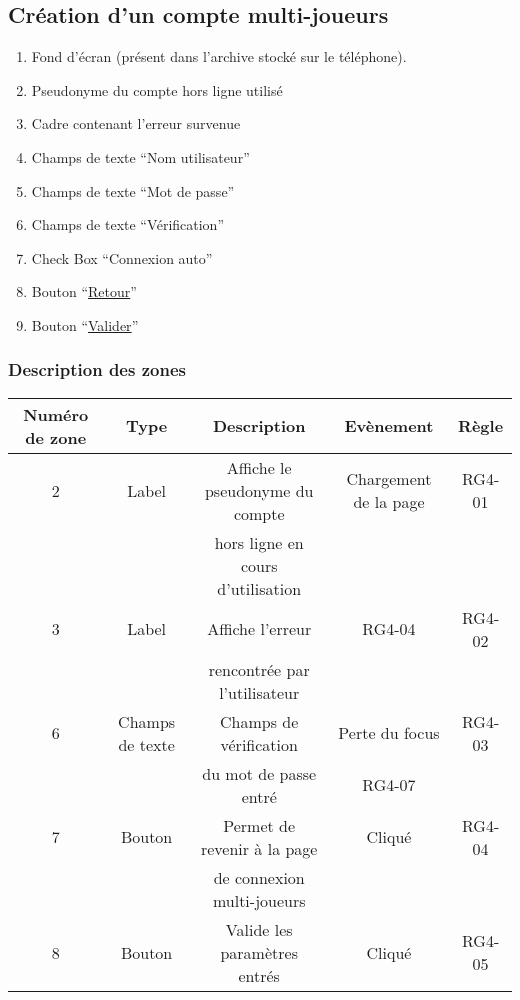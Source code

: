 \documentclass{report}
\begin{document}
\newpage

	\subsection{Création d'un compte multi-joueurs}
	
		\hypertarget{Creation compte multi-joueurs}{}
		\label{Creation compte multi-joueurs}
	
		\begin{center}
			
		\end{center}
		
		\begin{enumerate}
		  \item Fond d'écran (présent dans l'archive stocké sur le téléphone).
		  \item Pseudonyme du compte hors ligne utilisé
		  \item Cadre contenant l'erreur survenue
		  \item Champs de texte ``Nom utilisateur''
		  \item Champs de texte ``Mot de passe''
		  \item Champs de texte ``Vérification''
		  \item Check Box ``Connexion auto''
		  \item Bouton ``\hyperlink{Connexion multi-joueurs}{Retour}''
		  \item Bouton ``\hyperlink{Accueil multi-joueurs}{Valider}''
		\end{enumerate}
		
		\subsubsection{Description des zones}
		
			\begin{tabular}{|c|c|c|c|c|} \hline
				Numéro de zone & Type  & Description & Evènement &	Règle \\\hline
				2 & Label & Affiche le pseudonyme du compte & Chargement de la page & RG4-01 \\
				  &       & hors ligne en cours d'utilisation & & \\\hline
				3 & Label & Affiche l'erreur & RG4-04 & RG4-02\\
				  &       & rencontrée par l'utilisateur & & \\\hline
				6 & Champs de texte & Champs de vérification & Perte du focus & RG4-03 \\
				 & & du mot de passe entré & RG4-07 & \\\hline 
				7 & Bouton & Permet de revenir à la page & Cliqué & RG4-04 \\
				  &        & de connexion multi-joueurs \footnotemark[1] & & \\\hline
				8 & Bouton & Valide les paramètres entrés & Cliqué & RG4-05 \\\hline
			\end{tabular}
			
\end{document}
